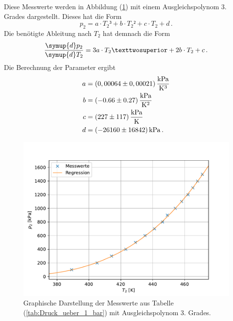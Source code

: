     Diese Messwerte werden in Abbildung (\ref{fig:Druck_ueber_1_bar}) mit einem Ausgleichspolynom 3. Grades dargestellt.
    Dieses hat die Form 
    \begin{equation}
      p_2 = a \cdot T_2³ + b \cdot T_2² + c \cdot T_2 + d \,.
    \end{equation}
    Die benötigte Ableitung nach $T_2$ hat demnach die Form
    \begin{equation}
      \frac{\symup{d}p_2}{\symup{d}T_2} = 3  a \cdot T_2² + 2 b \cdot T_2 + c \,.
    \end{equation}
    Die Berechnung der Parameter ergibt 
    \begin{align*}
      a &= (0,00064 \pm 0,00021) \, \unit[per-mode=fraction]{\kilo\pascal\per\kelvin\tothe{3}} \\
      b &= (-0.66 \pm 0.27)\, \unit[per-mode=fraction]{\kilo\pascal\per\kelvin\tothe{2}} \\
      c &= (227 \pm 117) \, \unit[per-mode=fraction]{\kilo\pascal\per\kelvin} \\
      d &= (-26160 \pm 16842) \, \unit{\kilo\pascal} \, .
    \end{align*}

    \begin{figure}[H]
      \centering
      \includegraphics{plot2.pdf}
      \caption{Graphische Darstellung der Messwerte aus Tabelle (\ref{tab:Druck_ueber_1_bar}) mit Ausgleichspolynom 3. Grades.}
      \label{fig:Druck_ueber_1_bar}
    \end{figure}
    
